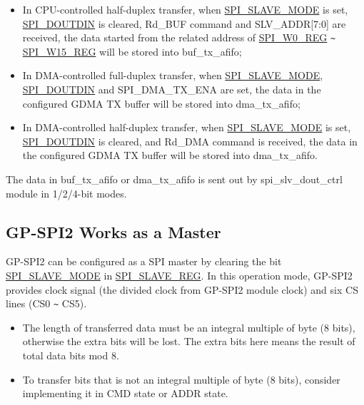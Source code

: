 \documentclass[main\_\_EN.tex]{subfiles}
\begin{document}
\begin{itemize}
\begin{itemize}
        \item In CPU-controlled half-duplex transfer, when \hyperref[fielddesc:SPISLAVEMODE]{SPI\_SLAVE\_MODE} is set, \hyperref[fielddesc:SPIDOUTDIN]{SPI\_DOUTDIN} is cleared, Rd\_BUF command and SLV\_ADDR[7:0] are received, the data started from the related address of \hyperref[regdesc:SPIW0REG]{SPI\_W0\_REG} \verb+~+ \hyperref[regdesc:SPIW15REG]{SPI\_W15\_REG} will be stored into buf\_tx\_afifo;

        \item In DMA-controlled full-duplex transfer, when \hyperref[fielddesc:SPISLAVEMODE]{SPI\_SLAVE\_MODE}, \hyperref[fielddesc:SPIDOUTDIN]{SPI\_DOUTDIN} and SPI\_DMA\_TX\_ENA are set, the data in the configured GDMA TX buffer will be stored into dma\_tx\_afifo;

        \item In DMA-controlled half-duplex transfer, when \hyperref[fielddesc:SPISLAVEMODE]{SPI\_SLAVE\_MODE} is set, \hyperref[fielddesc:SPIDOUTDIN]{SPI\_DOUTDIN} is cleared, and Rd\_DMA command is received, the data in the configured GDMA TX buffer will be stored into dma\_tx\_afifo.

    \end{itemize}

The data in buf\_tx\_afifo or dma\_tx\_afifo is sent out by spi\_slv\_dout\_ctrl module in 1/2/4-bit modes.
\end{itemize}

\subsection{GP-SPI2 Works as a Master}\label{sec:gp-spi2-master-mode}

GP-SPI2 can be configured as a SPI master by clearing the bit \hyperref[fielddesc:SPISLAVEMODE]{SPI\_SLAVE\_MODE} in \hyperref[regdesc:SPISLAVEREG]{SPI\_SLAVE\_REG}. In this operation mode, GP-SPI2 provides clock signal (the divided clock from GP-SPI2 module clock) and six CS lines (CS0 \verb+~+ CS5).

\begin{tiplisting}
\vspace{-2em}
\begin{itemize}
    \item The length of transferred data must be an integral multiple of byte (8 bits), otherwise the extra bits will be lost. The extra bits here means the result of total data bits mod 8.
    \item To transfer bits that is not an integral multiple of byte (8 bits), consider implementing it in CMD state or ADDR state.
\end{itemize}
\end{tiplisting}
\end{document}
